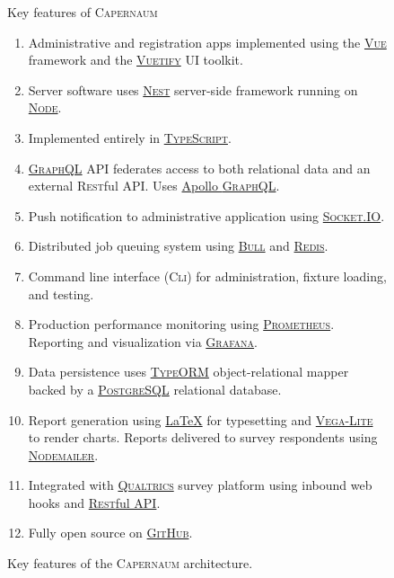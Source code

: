 \documentclass{article}
\newcommand{\bull}{\textsc{Bull}}
\newcommand{\caper}{\textsc{Capernaum}}
\newcommand{\cli}{\textsc{Cli}}
\newcommand{\gh}{\textsc{GitHub}}
\newcommand{\gql}{\textsc{GraphQL}}
\newcommand{\grafana}{\textsc{Grafana}}
\newcommand{\nest}{\textsc{Nest}}
\newcommand{\nodemailer}{\textsc{Node\-mailer}}
\newcommand{\node}{\textsc{Node}}
\newcommand{\pg}{\textsc{PostgreSQL}}
\newcommand{\prometheus}{\textsc{Prometheus}}
\newcommand{\redis}{\textsc{Redis}}
\newcommand{\rest}{\textsc{Rest}ful}
\newcommand{\sio}{\textsc{Socket.IO}}
\newcommand{\ts}{\textsc{TypeScript}}
\newcommand{\typeorm}{\textsc{TypeORM}}
\newcommand{\vega}{\textsc{Vega-Lite}}
\newcommand{\vuetify}{\textsc{Vuetify}}
\newcommand{\vue}{\textsc{Vue}}
\newcommand{\qual}{\textsc{Qualtrics}}
\begin{document}
\begin{figure}
  \centering
  \begin{cbox}{Key features of \caper}
    \begin{enumerate}
    \item Administrative and registration apps implemented using
      the \href{https://vuejs.org/}{\vue{}} framework and
      the \href{https://vuetifyjs.com/}{\vuetify} UI toolkit.
    \item Server software uses
      \href{https://nestjs.com/}{\nest} server-side framework
      running on \href{https://nodejs.org/}{\node}.
    \item Implemented entirely in \href{https://www.typescriptlang.org/}{\ts}.
    \item \href{https://graphql.org/}{\gql{}} API
      federates access to both relational data and an external \rest{} API.
      Uses \href{https://www.apollographql.com/}{Apollo \gql}.
    \item Push notification to administrative application
      using \href{https://socket.io/}{\sio}.
    \item Distributed job queuing system
      using \href{https://www.npmjs.com/package/bull}{\bull}
      and \href{https://redis.io/}{\redis}.
    \item Command line interface (\cli) for administration, fixture loading, and testing.
    \item Production performance monitoring using \href{https://prometheus.io/}{\prometheus}.
      Reporting and visualization via \href{https://grafana.com/grafana/}{\grafana}.
    \item Data persistence uses
      \href{https://typeorm.io/}{\typeorm} object-relational mapper
      backed by a 
      \href{https://www.postgresql.org/}{\pg{}} relational database.
    \item Report generation using \href{https://www.latex-project.org/}{\LaTeX} for typesetting
      and \href{https://vega.github.io/vega-lite/}{\vega} to render charts.
      Reports delivered to survey respondents using \href{https://nodemailer.com/}{\nodemailer}.
    \item Integrated with
      \href{https://www.qualtrics.com/}{\qual} survey platform
      using inbound web hooks and
      \href{https://api.qualtrics.com/}{\rest{} API}.
    \item Fully open source on \href{https://github.com/quantum-bits/capernaum.git}{\gh}.
    \end{enumerate}
  \end{cbox}
  \caption{Key features of the \caper{} architecture.}
  \label{fig:features}
\end{figure}
\end{document}
